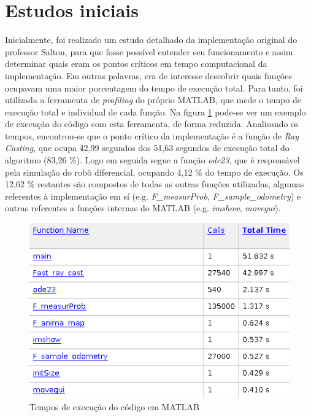 \documentclass[
	12pt,				%
	openright,			%
	oneside,			%
	a4paper,			%
	english,			%
	french,				%
	spanish,			%
	brazil,				%
	]{abntex2}
\begin{document}
\section{Estudos iniciais}
\label{sec:estudos_iniciais}
Inicialmente, foi realizado um estudo detalhado da implementação original do professor Salton, para que fosse possível entender seu funcionamento e assim determinar quais eram os pontos críticos em tempo computacional da implementação. Em outras palavras, era de interesse descobrir quais funções ocupavam uma maior porcentagem do tempo de execução total. Para tanto, foi utilizada a ferramenta de \emph{profiling} do próprio MATLAB, que mede o tempo de execução total e individual de cada função. Na figura \ref{fig:matlab_profile} pode-se ver um exemplo de execução do código com esta ferramenta, de forma reduzida. Analisando os tempos, encontrou-se que o ponto crítico da implementação é a função de \emph{Ray Casting}, que ocupa 42,99 segundos dos 51,63 segundos de execução total do algoritmo (83,26 \%). Logo em seguida segue a função \emph{ode23}, que é responsável pela simulação do robô diferencial, ocupando 4,12 \% do tempo de execução. Os 12,62 \% restantes são compostos de todas as outras funções utilizadas, algumas referentes à implementação em sí (e.g. \emph{F\_measurProb}, \emph{F\_sample\_odometry}) e outras referentes a funções internas do MATLAB (e.g. \emph{imshow}, \emph{movegui}).

\begin{figure}[h!]
    \centering
    \includegraphics[scale=0.7]{figs/matlab_profile}
    \caption{Tempos de execução do código em MATLAB}
    \label{fig:matlab_profile}
\end{figure}
\end{document}
